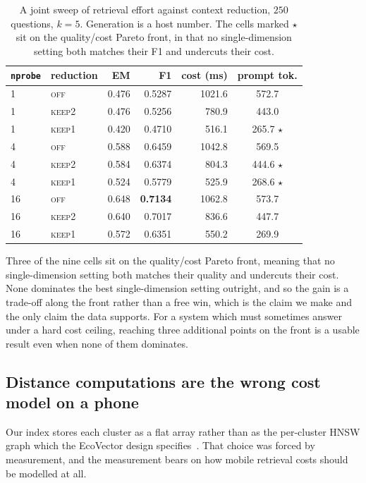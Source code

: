 \documentclass[journal]{IEEEtran}
\newcommand{\nprobe}{\texttt{nprobe}}
\begin{document}
\begin{table}[!t]
\caption{A joint sweep of retrieval effort against context reduction, $250$
questions, $k = 5$. Generation is a host number. The cells marked $\star$
sit on the quality/cost Pareto front, in that no single-dimension setting
both matches their F1 and undercuts their cost.}
\label{tab:joint}
\centering
\begin{tabular}{llrrrc}
\toprule
\nprobe & reduction & EM & F1 & cost (ms) & prompt tok. \\
\midrule
1  & \textsc{off}   & 0.476 & 0.5287 & 1021.6 & 572.7 \\
1  & \textsc{keep2} & 0.476 & 0.5256 & 780.9  & 443.0 \\
1  & \textsc{keep1} & 0.420 & 0.4710 & 516.1  & 265.7 $\star$ \\
4  & \textsc{off}   & 0.588 & 0.6459 & 1042.8 & 569.5 \\
4  & \textsc{keep2} & 0.584 & 0.6374 & 804.3  & 444.6 $\star$ \\
4  & \textsc{keep1} & 0.524 & 0.5779 & 525.9  & 268.6 $\star$ \\
16 & \textsc{off}   & 0.648 & \textbf{0.7134} & 1062.8 & 573.7 \\
16 & \textsc{keep2} & 0.640 & 0.7017 & 836.6  & 447.7 \\
16 & \textsc{keep1} & 0.572 & 0.6351 & 550.2  & 269.9 \\
\bottomrule
\end{tabular}
\end{table}

Three of the nine cells sit on the quality/cost Pareto front, meaning that
no single-dimension setting both matches their quality and undercuts their
cost. None dominates the best single-dimension setting outright, and so the
gain is a trade-off along the front rather than a free win, which is the
claim we make and the only claim the data supports. For a system which must
sometimes answer under a hard cost ceiling, reaching three additional
points on the front is a usable result even when none of them dominates.

\subsection{Distance computations are the wrong cost model on a phone}
\label{sec:regime}

Our index stores each cluster as a flat array rather than as the
per-cluster HNSW graph which the EcoVector design
specifies~\cite{park2025mobilerag}. That choice was forced by measurement,
and the measurement bears on how mobile retrieval costs should be modelled
at all.
\end{document}
